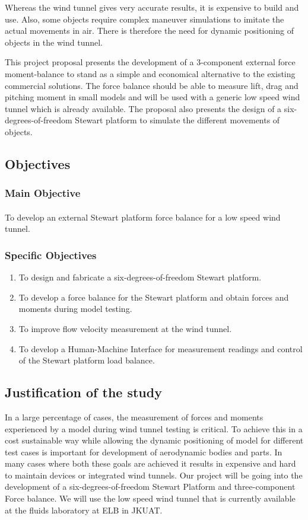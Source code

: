 Whereas the wind tunnel gives very accurate results, it is expensive to build and use. Also, some objects require complex maneuver simulations to imitate the actual movements in air. There is therefore the need for dynamic positioning of objects in the wind tunnel.

This project proposal presents the development of a 3-component external force moment-balance to stand as a simple and economical alternative to the existing commercial solutions. The force balance should be able to measure lift, drag and pitching moment in small models and will be used with a generic low speed wind tunnel which is already available. The proposal also presents the design of a six-degrees-of-freedom Stewart platform to simulate the different movements of objects.
\subsection{Objectives}
\subsubsection{Main Objective}
\paragraph{} To develop an external Stewart platform force balance for a low speed wind tunnel. 
\subsubsection{Specific Objectives}
\begin{enumerate}
\item To design and fabricate a six-degrees-of-freedom Stewart platform.
\item To develop a force balance for the Stewart platform and obtain forces and moments during model testing.
\item To improve flow velocity measurement at the wind tunnel.
\item To develop a Human-Machine Interface for measurement readings and control of the Stewart platform load balance.
\end{enumerate}
\subsection{Justification of the study}
In a large percentage of cases, the measurement of forces and moments experienced by a model during wind tunnel testing is critical. To achieve this in a cost sustainable way while allowing the dynamic positioning of model for different test cases is important for development of aerodynamic bodies and parts. In many cases where both these goals are achieved it results in expensive and hard to maintain devices or integrated wind tunnels. Our project will be going into the development of a six-degrees-of-freedom Stewart Platform and three-component Force balance. We will use the low speed wind tunnel that is currently available at the fluids laboratory at ELB in JKUAT.

